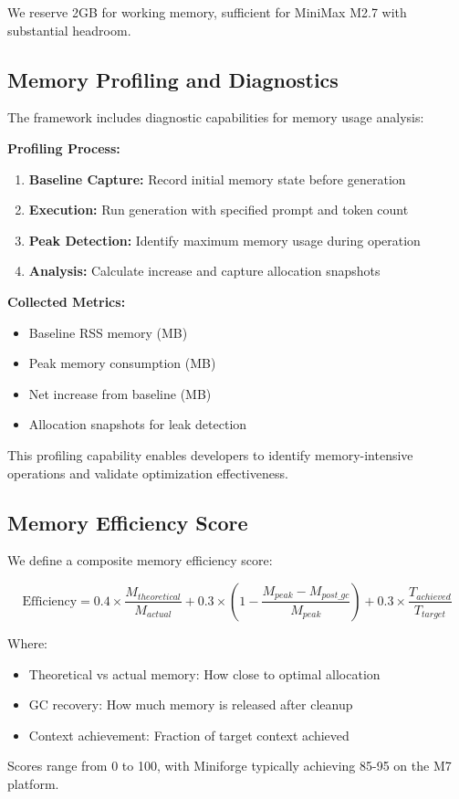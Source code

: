 We reserve 2GB for working memory, sufficient for MiniMax M2.7 with substantial headroom.

\subsection{Memory Profiling and Diagnostics}

The framework includes diagnostic capabilities for memory usage analysis:

\textbf{Profiling Process:}
\begin{enumerate}
    \item \textbf{Baseline Capture:} Record initial memory state before generation
    \item \textbf{Execution:} Run generation with specified prompt and token count
    \item \textbf{Peak Detection:} Identify maximum memory usage during operation
    \item \textbf{Analysis:} Calculate increase and capture allocation snapshots
\end{enumerate}

\textbf{Collected Metrics:}
\begin{itemize}
    \item Baseline RSS memory (MB)
    \item Peak memory consumption (MB)
    \item Net increase from baseline (MB)
    \item Allocation snapshots for leak detection
\end{itemize}

This profiling capability enables developers to identify memory-intensive operations and validate optimization effectiveness.

\subsection{Memory Efficiency Score}

We define a composite memory efficiency score:

\begin{equation}
\text{Efficiency} = 0.4 \times \frac{M_{theoretical}}{M_{actual}} + 0.3 \times \left(1 - \frac{M_{peak} - M_{post\_gc}}{M_{peak}}\right) + 0.3 \times \frac{T_{achieved}}{T_{target}}
\end{equation}

Where:
\begin{itemize}
    \item Theoretical vs actual memory: How close to optimal allocation
    \item GC recovery: How much memory is released after cleanup
    \item Context achievement: Fraction of target context achieved
\end{itemize}

Scores range from 0 to 100, with Miniforge typically achieving 85-95 on the M7 platform.
